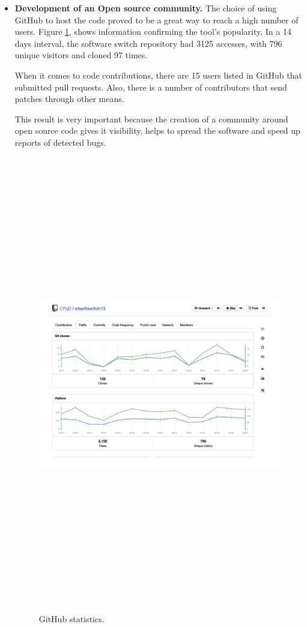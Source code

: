 \begin{itemize}
\item \textbf{Development of an Open source community.} The choice of using GitHub to host the code proved to be a great way to reach a high number of users. Figure \ref{fig:ghstats}, shows information confirming the tool's popularity. In a 14 days interval, the software switch repository had 3125 accesses, with 796 unique visitors and cloned 97 times. 

When it comes to code contributions, there are 15 users listed in GitHub that submitted pull requests. Also, there is a number of contributors that send patches through other means.

This result is very important because the creation of a community around open source code gives it visibility, helps to spread the software and speed up reports of detected bugs. 

\begin{figure}[H]
\centering
\includegraphics[height=20cm,width=\textwidth,keepaspectratio]{eps/GH.pdf}
\caption{GitHub statistics.}
\label{fig:ghstats}
\end{figure}


\end{itemize}
